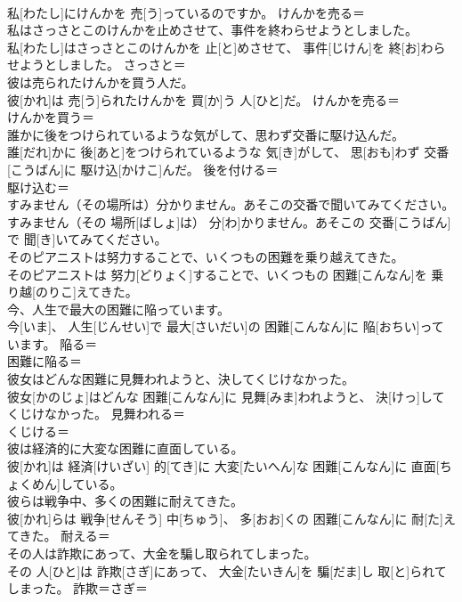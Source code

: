 \documentclass[8pt]{extreport}
\begin{document}
\begin{CJK}{UTF8}{min}
\\	私[わたし]にけんかを 売[う]っているのですか。	けんかを売る＝ 
\\	私はさっさとこのけんかを止めさせて、事件を終わらせようとしました。	
\\	私[わたし]はさっさとこのけんかを 止[と]めさせて、 事件[じけん]を 終[お]わらせようとしました。	さっさと＝ 
\\	彼は売られたけんかを買う人だ。	
\\	彼[かれ]は 売[う]られたけんかを 買[か]う 人[ひと]だ。	けんかを売る＝ 
\\	けんかを買う＝ 
\\	誰かに後をつけられているような気がして、思わず交番に駆け込んだ。	
\\	誰[だれ]かに 後[あと]をつけられているような 気[き]がして、 思[おも]わず 交番[こうばん]に 駆け込[かけこ]んだ。	後を付ける＝ 
\\	駆け込む＝ 
\\	すみません（その場所は）分かりません。あそこの交番で聞いてみてください。	
\\	すみません（その 場所[ばしょ]は） 分[わ]かりません。あそこの 交番[こうばん]で 聞[き]いてみてください。	
\\	そのピアニストは努力することで、いくつもの困難を乗り越えてきた。	
\\	そのピアニストは 努力[どりょく]することで、いくつもの 困難[こんなん]を 乗り越[のりこ]えてきた。	
\\	今、人生で最大の困難に陥っています。	
\\	今[いま]、 人生[じんせい]で 最大[さいだい]の 困難[こんなん]に 陥[おちい]っています。	陥る＝ 
\\	困難に陥る＝ 
\\	彼女はどんな困難に見舞われようと、決してくじけなかった。	
\\	彼女[かのじょ]はどんな 困難[こんなん]に 見舞[みま]われようと、 決[けっ]してくじけなかった。	見舞われる＝ 
\\	くじける＝ 
\\	彼は経済的に大変な困難に直面している。	
\\	彼[かれ]は 経済[けいざい] 的[てき]に 大変[たいへん]な 困難[こんなん]に 直面[ちょくめん]している。	
\\	彼らは戦争中、多くの困難に耐えてきた。	
\\	彼[かれ]らは 戦争[せんそう] 中[ちゅう]、 多[おお]くの 困難[こんなん]に 耐[た]えてきた。	耐える＝ 
\\	その人は詐欺にあって、大金を騙し取られてしまった。	
\\	その 人[ひと]は 詐欺[さぎ]にあって、 大金[たいきん]を 騙[だま]し 取[と]られてしまった。	詐欺＝さぎ＝ 

\end{CJK}
\end{document}
